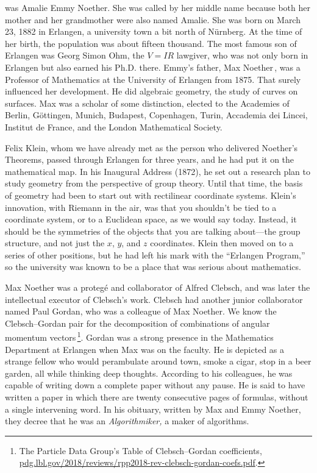 \documentclass[twoside,symmetric]{tufte-handout}
\begin{document}

 was Amalie Emmy Noether. She was called by her middle name because both her mother and her grandmother were also named Amalie. She was born on March 23, 1882 in Erlangen, a university town a bit north of N\"urnberg. At the time of her birth, the population was about fifteen thousand. The most famous son of Erlangen was Georg Simon Ohm, the $V=IR$ lawgiver, who was not only born in Erlangen but also earned his Ph.D. there. Emmy's father, Max Noether$\,$\cite{MaxLebenWerk}, was a Professor of Mathematics at the University of Erlangen from 1875. That surely influenced her development. He did algebraic geometry, the study of curves on surfaces. Max was a scholar of some distinction, elected to the Academies of Berlin, G\"ottingen, Munich, Budapest, Copenhagen, Turin, Accademia dei Lincei, Institut de France, and the London Mathematical Society.

Felix Klein, whom we have already met as the person who delivered Noether's Theorems, passed through Erlangen for three years, and he had put it on the mathematical map. In his Inaugural Address (1872), he set out a research plan to study geometry from the perspective of group theory. Until that time, the basis of geometry had been to start out with rectilinear coordinate systems. Klein's innovation, with Riemann in the air, was that you shouldn't be tied to a coordinate system, or to a Euclidean space, as we would say today. Instead, it should be the symmetries of the objects that you are talking about---the group structure, and not just the $x$, $y$, and $z$ coordinates. Klein then moved on to a series of other positions, but he had left his mark with the ``Erlangen Program,''$\,$\cite[-57pt]{10.5749/j.cttttp0k.9} so the university was known to be a place that was serious about mathematics.

Max Noether was a proteg\'e and collaborator of Alfred Clebsch, and was later the intellectual executor of Clebsch's work. Clebsch had another junior collaborator named Paul Gordan, who was a colleague of Max Noether. We know the Clebsch--Gordan pair for the decomposition of combinations of angular momentum vectors$\,$\footnote{The Particle Data Group's Table of Clebsch--Gordan coefficients, \url{pdg.lbl.gov/2018/reviews/rpp2018-rev-clebsch-gordan-coefs.pdf}.}. %
Gordan was a strong presence in the Mathematics Department at Erlangen when Max was on the faculty. He is depicted as a strange fellow who would perambulate around town, smoke a cigar, stop in a beer garden, all while thinking deep thoughts. According to his colleagues, he was capable of writing down a complete paper without any pause. He is said to have written a paper in which there are twenty consecutive pages of formulas, without a single intervening word. In his obituary, written by Max and Emmy Noether, they decree that he was an \emph{Algorithmiker,} a maker of algorithms.
\end{document}
